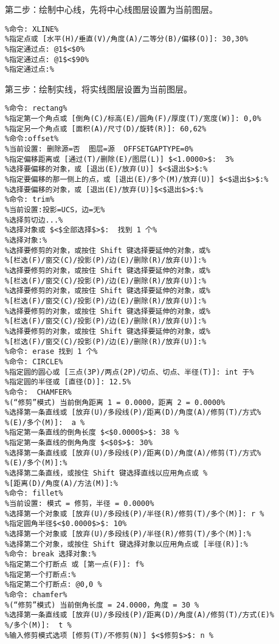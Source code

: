 第二步：绘制中心线，先将中心线图层设置为当前图层。
\begin{lstlisting}
%命令: XLINE%
%指定点或 [水平(H)/垂直(V)/角度(A)/二等分(B)/偏移(O)]: 30,30%
%指定通过点: @1$<$0%
%指定通过点: @1$<$90%
%指定通过点:%
\end{lstlisting}
第三步：绘制实线，将实线图层设置为当前图层。
\begin{lstlisting}
%命令: rectang%
%指定第一个角点或 [倒角(C)/标高(E)/圆角(F)/厚度(T)/宽度(W)]: 0,0%
%指定另一个角点或 [面积(A)/尺寸(D)/旋转(R)]: 60,62%
%命令:offset%
%当前设置: 删除源=否  图层=源  OFFSETGAPTYPE=0%
%指定偏移距离或 [通过(T)/删除(E)/图层(L)] $<1.0000>$:  3%
%选择要偏移的对象，或 [退出(E)/放弃(U)] $<$退出$>$:%
%指定要偏移的那一侧上的点，或 [退出(E)/多个(M)/放弃(U)] $<$退出$>$:%
%选择要偏移的对象，或 [退出(E)/放弃(U)]$<$退出$>$:%
%命令: trim%
%当前设置:投影=UCS，边=无%
%选择剪切边...%
%选择对象或 $<$全部选择$>$:  找到 1 个%
%选择对象:%
%选择要修剪的对象，或按住 Shift 键选择要延伸的对象，或%
%[栏选(F)/窗交(C)/投影(P)/边(E)/删除(R)/放弃(U)]:%
%选择要修剪的对象，或按住 Shift 键选择要延伸的对象，或%
%[栏选(F)/窗交(C)/投影(P)/边(E)/删除(R)/放弃(U)]:%
%选择要修剪的对象，或按住 Shift 键选择要延伸的对象，或%
%[栏选(F)/窗交(C)/投影(P)/边(E)/删除(R)/放弃(U)]:%
%选择要修剪的对象，或按住 Shift 键选择要延伸的对象，或%
%[栏选(F)/窗交(C)/投影(P)/边(E)/删除(R)/放弃(U)]:%
%选择要修剪的对象，或按住 Shift 键选择要延伸的对象，或%
%[栏选(F)/窗交(C)/投影(P)/边(E)/删除(R)/放弃(U)]:%
%命令: erase 找到 1 个%
%命令: CIRCLE%
%指定圆的圆心或 [三点(3P)/两点(2P)/切点、切点、半径(T)]: int 于%
%指定圆的半径或 [直径(D)]: 12.5%
%命令:  CHAMFER%
%(“修剪”模式) 当前倒角距离 1 = 0.0000，距离 2 = 0.0000%
%选择第一条直线或 [放弃(U)/多段线(P)/距离(D)/角度(A)/修剪(T)/方式%
%(E)/多个(M)]:  a %
%指定第一条直线的倒角长度 $<$0.0000$>$: 38 %
%指定第一条直线的倒角角度 $<$0$>$: 30%
%选择第一条直线或 [放弃(U)/多段线(P)/距离(D)/角度(A)/修剪(T)/方式%
%(E)/多个(M)]:%
%选择第二条直线，或按住 Shift 键选择直线以应用角点或 %
%[距离(D)/角度(A)/方法(M)]:%
%命令: fillet%
%当前设置: 模式 = 修剪，半径 = 0.0000%
%选择第一个对象或 [放弃(U)/多段线(P)/半径(R)/修剪(T)/多个(M)]: r %
%指定圆角半径$<$0.0000$>$: 10%
%选择第一个对象或 [放弃(U)/多段线(P)/半径(R)/修剪(T)/多个(M)]:%
%选择第二个对象，或按住 Shift 键选择对象以应用角点或 [半径(R)]:%
%命令: break 选择对象:%
%指定第二个打断点 或 [第一点(F)]: f%
%指定第一个打断点:%
%指定第二个打断点: @0,0 %
%命令: chamfer%
%(“修剪”模式) 当前倒角长度 = 24.0000，角度 = 30 %
%选择第一条直线或 [放弃(U)/多段线(P)/距离(D)/角度(A)/修剪(T)/方式(E)%
%/多个(M)]:  t %
%输入修剪模式选项 [修剪(T)/不修剪(N)] $<$修剪$>$: n %

\end{lstlisting}
